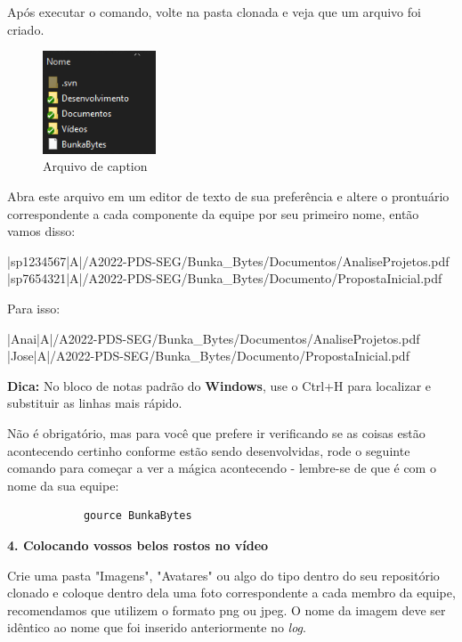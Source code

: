 Após executar o comando, volte na pasta clonada e veja que um arquivo foi criado.

\begin{figure}[htb]
        \centering
        \caption{Arquivo de caption}
        \includegraphics[width=0.3\textwidth]{anexos/Imagens_Blog/arquivo_log.png}
        \end{figure}
        \FloatBarrier

Abra este arquivo em um editor de texto de sua preferência e altere o prontuário correspondente a cada componente da equipe por seu primeiro nome, então vamos disso:

|sp1234567|A|/A2022-PDS-SEG/Bunka\_Bytes/Documentos/AnaliseProjetos.pdf \\
|sp7654321|A|/A2022-PDS-SEG/Bunka\_Bytes/Documento/PropostaInicial.pdf

Para isso:

|Anai|A|/A2022-PDS-SEG/Bunka\_Bytes/Documentos/AnaliseProjetos.pdf \\
|Jose|A|/A2022-PDS-SEG/Bunka\_Bytes/Documento/PropostaInicial.pdf

\textbf{Dica:} No bloco de notas padrão do \textbf{Windows}, use o Ctrl+H para localizar e substituir as linhas mais rápido.

Não é obrigatório, mas para você que prefere ir verificando se as coisas estão acontecendo certinho conforme estão sendo desenvolvidas, rode o seguinte comando para começar a ver a mágica acontecendo - lembre-se de que é com o nome da sua equipe:

\lstset{language=Fortran,
             basicstyle=\ttfamily\small,
             showstringspaces=false
    }
        \begin{lstlisting} 
            gource BunkaBytes
        \end{lstlisting}
        
\textbf{4. Colocando vossos belos rostos no vídeo}

Crie uma pasta "Imagens", "Avatares" ou algo do tipo dentro do seu repositório clonado e coloque dentro dela uma foto correspondente a cada membro da equipe, recomendamos que utilizem o formato png ou jpeg. O nome da imagem deve ser idêntico ao nome que foi inserido anteriormente no \textit{log}. 

